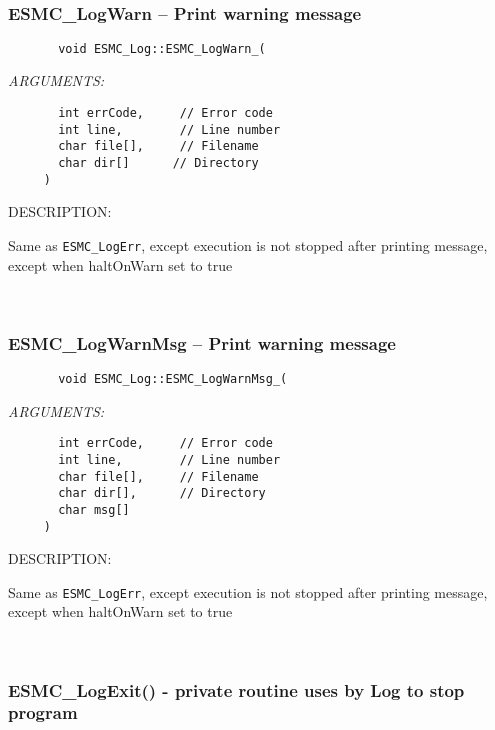 \mbox{}\hrulefill\ 
 
\subsubsection [ESMC\_LogWarn] {ESMC\_LogWarn -- Print warning message}


  
\begin{verbatim}       void ESMC_Log::ESMC_LogWarn_(\end{verbatim}{\em ARGUMENTS:}
\begin{verbatim}       int errCode,     // Error code
       int line,        // Line number
       char file[],     // Filename
       char dir[]      // Directory
     )\end{verbatim}
{\sf DESCRIPTION:\\ }


    Same as {\tt ESMC\_LogErr}, except execution is not stopped after
    printing message, except when haltOnWarn set to true
   
 
\mbox{}\hrulefill\ 
 
\subsubsection [ESMC\_LogWarnMsg] {ESMC\_LogWarnMsg -- Print warning message}


  
\begin{verbatim}       void ESMC_Log::ESMC_LogWarnMsg_(\end{verbatim}{\em ARGUMENTS:}
\begin{verbatim}       int errCode,     // Error code
       int line,        // Line number
       char file[],     // Filename
       char dir[],      // Directory
       char msg[]
     )\end{verbatim}
{\sf DESCRIPTION:\\ }


    Same as {\tt ESMC\_LogErr}, except execution is not stopped after
    printing message, except when haltOnWarn set to true
   
 
\mbox{}\hrulefill\ 
 

  \subsubsection [ESMC\_LogExit()] {ESMC\_LogExit() - private routine uses by Log to stop program}


